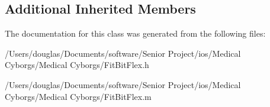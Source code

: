 \subsection*{Additional Inherited Members}


The documentation for this class was generated from the following files\-:\begin{DoxyCompactItemize}
\item 
/\-Users/douglas/\-Documents/software/\-Senior Project/ios/\-Medical Cyborgs/\-Medical Cyborgs/Fit\-Bit\-Flex.\-h\item 
/\-Users/douglas/\-Documents/software/\-Senior Project/ios/\-Medical Cyborgs/\-Medical Cyborgs/Fit\-Bit\-Flex.\-m\end{DoxyCompactItemize}
